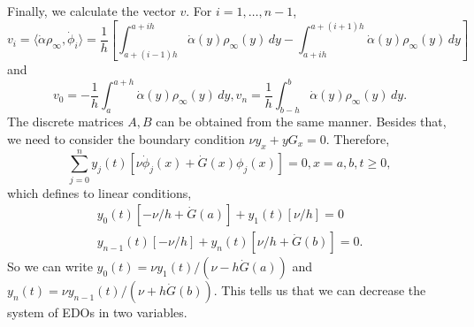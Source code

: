 \documentclass[12pt]{article}
\newcommand{\steady}{\rho_{\infty}}
\newcommand{\inner}[2]{\langle{} #1, #2 \rangle{}}
\theoremstyle{definition}
\begin{document}
Finally, we calculate the vector $v$.
For $i=1,\dots,n-1$,
\[
v_i = \inner{\dot\alpha \steady}{\dot{\phi}_i} = \frac{1}{h}\left[\int_{a+(i-1)h}^{a+ih} \dot\alpha(y) \steady(y)  \, dy- \int_{a+ih}^{a+(i+1)h} \dot\alpha(y) \steady(y) \, dy \right]    
\]
and 
\[
v_0 = -\frac{1}{h} \int_a^{a+h} \dot\alpha(y) \steady(y)  \, dy, v_n = \frac{1}{h} \int_{b-h}^{b} \dot\alpha(y) \steady(y)  \, dy.
\]
The discrete matrices $A, B$ can be obtained from the same manner. 
Besides that, we need to consider the boundary condition $\nu y_x + y G_x = 0$.
Therefore, 
\[
\sum_{j=0}^{n} y_j(t) \left[\nu\dot\phi_j(x) + \dot{G}(x) \phi_j(x)\right] = 0, x=a,b, t \ge 0, 
\]
which defines to linear conditions, 
\begin{gather*}
    y_0(t) \left[-\nu/h + \dot{G}(a)\right] + y_1(t) \left[\nu/h\right] = 0 \\
    y_{n-1}(t) \left[-\nu/h\right] + y_n(t) \left[\nu/h + \dot{G}(b)\right] = 0.
\end{gather*}
So we can write $y_0(t) = \nu y_1(t)/(\nu-h\dot{G}(a))$ and $y_n(t) = \nu y_{n-1}(t) / (\nu + h\dot{G}(b))$.
This tells us that we can decrease the system of EDOs in two variables. 




\end{document}
